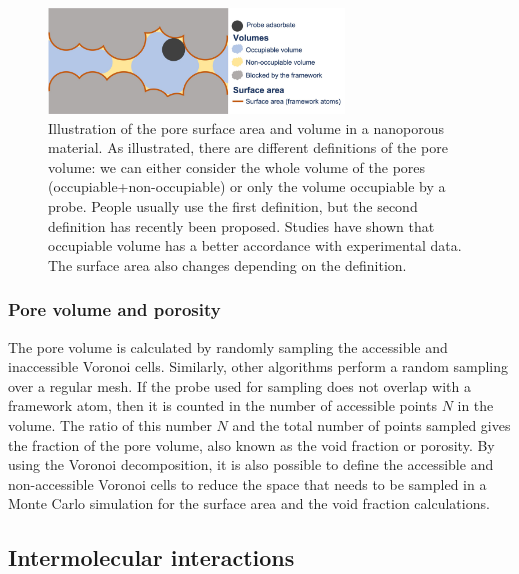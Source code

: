 \documentclass[main.tex]{subfiles}
\begin{document}
\begin{figure}[ht!]
  \centering
  \includegraphics[width=0.7\textwidth]{figures/1-screening/Pore_descriptors.jpg}
  \caption{Illustration of the pore surface area and volume in a nanoporous material. As illustrated, there are different definitions of the pore volume: we can either consider the whole volume of the pores (occupiable+non-occupiable) or only the volume occupiable by a probe. People usually use the first definition, but the second definition has recently been proposed. Studies have shown that occupiable volume has a better accordance with experimental data.\autocite{vol_Ongari2017} The surface area also changes depending on the definition. }\label{fgr:pores}
\end{figure}

\subsubsection{Pore volume and porosity}

The pore volume is calculated by randomly sampling the accessible and inaccessible Voronoi cells. Similarly, other algorithms perform a random sampling over a regular mesh. If the probe used for sampling does not overlap with a framework atom, then it is counted in the number of accessible points $N$ in the volume. The ratio of this number $N$ and the total number of points sampled gives the fraction of the pore volume, also known as the void fraction or porosity. By using the Voronoi decomposition, it is also possible to define the accessible and non-accessible Voronoi cells to reduce the space that needs to be sampled in a Monte Carlo simulation for the surface area and the void fraction calculations.


\subsection{Intermolecular interactions}\label{sct:interaction}
\end{document}

